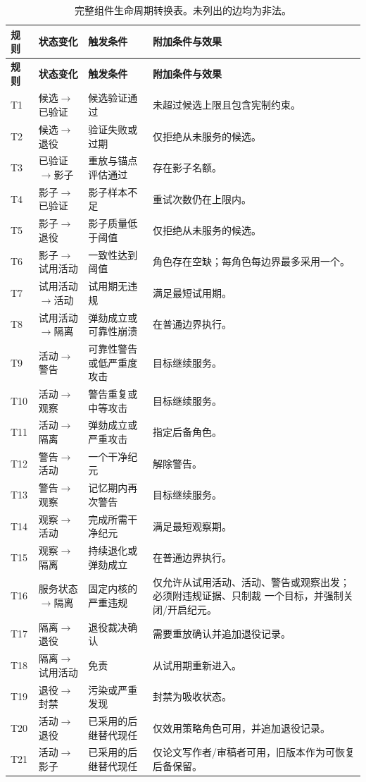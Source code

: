 \small
\begin{longtable}{@{}p{}p{}p{}p{}@{}}
  \caption{完整组件生命周期转换表。未列出的边均为非法。}
  \label{tab:component-transitions}\\
  \toprule
  \textbf{规则} & \textbf{状态变化} & \textbf{触发条件} & \textbf{附加条件与效果} \\
  \midrule
  \endfirsthead
  \toprule
  \textbf{规则} & \textbf{状态变化} & \textbf{触发条件} & \textbf{附加条件与效果} \\
  \midrule
  \endhead
  T1 & 候选$\rightarrow$已验证 & 候选验证通过 & 未超过候选上限且包含宪制约束。\\
  T2 & 候选$\rightarrow$退役 & 验证失败或过期 & 仅拒绝从未服务的候选。\\
  T3 & 已验证$\rightarrow$影子 & 重放与锚点评估通过 & 存在影子名额。\\
  T4 & 影子$\rightarrow$已验证 & 影子样本不足 & 重试次数仍在上限内。\\
  T5 & 影子$\rightarrow$退役 & 影子质量低于阈值 & 仅拒绝从未服务的候选。\\
  T6 & 影子$\rightarrow$试用活动 & 一致性达到阈值 &
    角色存在空缺；每角色每边界最多采用一个。\\
  T7 & 试用活动$\rightarrow$活动 & 试用期无违规 & 满足最短试用期。\\
  T8 & 试用活动$\rightarrow$隔离 & 弹劾成立或可靠性崩溃 & 在普通边界执行。\\
  T9 & 活动$\rightarrow$警告 & 可靠性警告或低严重度攻击 & 目标继续服务。\\
  T10 & 活动$\rightarrow$观察 & 警告重复或中等攻击 & 目标继续服务。\\
  T11 & 活动$\rightarrow$隔离 & 弹劾成立或严重攻击 & 指定后备角色。\\
  T12 & 警告$\rightarrow$活动 & 一个干净纪元 & 解除警告。\\
  T13 & 警告$\rightarrow$观察 & 记忆期内再次警告 & 目标继续服务。\\
  T14 & 观察$\rightarrow$活动 & 完成所需干净纪元 & 满足最短观察期。\\
  T15 & 观察$\rightarrow$隔离 & 持续退化或弹劾成立 & 在普通边界执行。\\
  T16 & 服务状态$\rightarrow$隔离 & 固定内核的严重违规 &
    仅允许从试用活动、活动、警告或观察出发；必须附违规证据、只制裁
    一个目标，并强制关闭/开启纪元。\\
  T17 & 隔离$\rightarrow$退役 & 退役裁决确认 & 需要重放确认并追加退役记录。\\
  T18 & 隔离$\rightarrow$试用活动 & 免责 & 从试用期重新进入。\\
  T19 & 退役$\rightarrow$封禁 & 污染或严重发现 & 封禁为吸收状态。\\
  T20 & 活动$\rightarrow$退役 & 已采用的后继替代现任 &
    仅效用策略角色可用，并追加退役记录。\\
  T21 & 活动$\rightarrow$影子 & 已采用的后继替代现任 &
    仅论文写作者/审稿者可用，旧版本作为可恢复后备保留。\\
  \bottomrule
\end{longtable}
\normalsize

